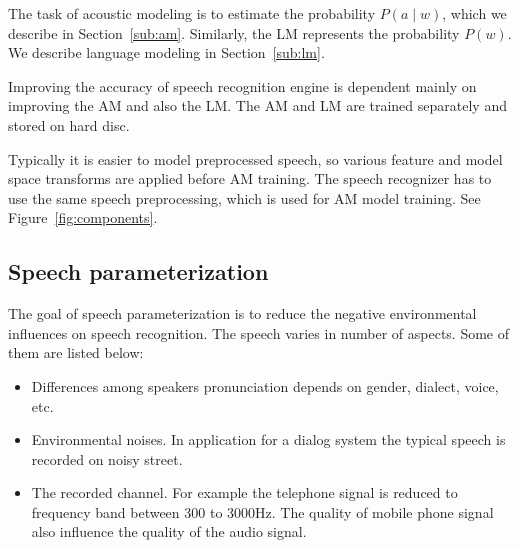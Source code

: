 The task of acoustic modeling is to estimate the probability $P(a \mid w)$,
which we describe in Section~\ref{sub:am}. 
Similarly, the \ac{LM} represents the probability $P(w)$.
We describe language modeling in Section~\ref{sub:lm}.

Improving the accuracy of speech recognition engine is dependent
mainly on improving the \ac{AM} and also the \ac{LM}.
The \ac{AM} and \ac{LM} are trained separately 
and stored on hard disc.

Typically it is easier to model preprocessed speech, 
so various feature and model space transforms are applied before \ac{AM} training.
The speech recognizer has to use the same speech preprocessing,
which is used for \ac{AM} model training.
See Figure~\ref{fig:components}.


% 


\subsection{Speech parameterization}
\label{sub:param}
The goal of speech parameterization is to reduce the negative environmental influences on speech recognition.
The speech varies in number of aspects. Some of them are listed below:
\begin{itemize}
    \item Differences among speakers pronunciation depends on gender, dialect, voice, etc.
    \item Environmental noises. In application for a dialog system the typical speech is
        recorded on noisy street. 
    \item The recorded channel. 
        For example the telephone signal is reduced to frequency band between 300 to 3000Hz.
        The quality of mobile phone signal also influence the quality of the audio signal.
\end{itemize}

